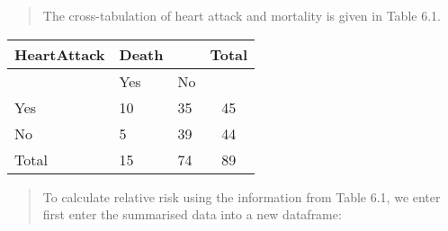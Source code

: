 \documentclass[
]{memoir}
\newenvironment{Shaded}{\begin{snugshade}}{\end{snugshade}}
\newcommand{\AttributeTok}[1]{\textcolor[rgb]{0.77,0.63,0.00}{#1}}
\newcommand{\DecValTok}[1]{\textcolor[rgb]{0.00,0.00,0.81}{#1}}
\newcommand{\FunctionTok}[1]{\textcolor[rgb]{0.00,0.00,0.00}{#1}}
\newcommand{\NormalTok}[1]{#1}
\newcommand{\OtherTok}[1]{\textcolor[rgb]{0.56,0.35,0.01}{#1}}
\newcommand{\SpecialCharTok}[1]{\textcolor[rgb]{0.00,0.00,0.00}{#1}}
\newcommand{\StringTok}[1]{\textcolor[rgb]{0.31,0.60,0.02}{#1}}
\begin{document}
\begin{quote}
The cross-tabulation of heart attack and mortality is given in Table 6.1.
\end{quote}

\begin{longtable}[]{@{}lllc@{}}
\toprule
HeartAttack & Death & & Total \\
\midrule
\endhead
& Yes & No & \\
Yes & 10 & 35 & 45 \\
No & 5 & 39 & 44 \\
Total & 15 & 74 & 89 \\
\bottomrule
\end{longtable}

\begin{quote}
To calculate relative risk using the information from Table 6.1, we enter first enter the summarised data into a new dataframe:
\end{quote}

\begin{Shaded}
\end{Shaded}
\end{document}
